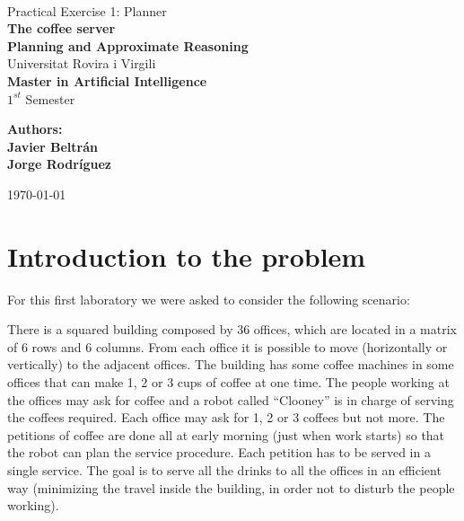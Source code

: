 \documentclass[12pt,a4paper,oneside]{article}
\date{\today}
\numberwithin{equation}{section}
\numberwithin{equation}{section}
\theoremstyle{definition}
\begin{document}
\begin{center}
	\textbf{ }\\[4cm]
	
	\LARGE Practical Exercise 1: Planner\\[0.5cm]
	\textbf{{\Huge The coffee server}}\\[0.5cm]
	\textbf{{\LARGE Planning and Approximate Reasoning}}\\[1.5cm]
	
	{\Large Universitat Rovira i Virgili}\\[2.3cm]
	{\LARGE \textbf{Master in Artificial Intelligence}}\\[0.5cm]
	{\LARGE $1^{st}$ Semester}\\[2.5cm]
	
	\begin{flushright}
		\textbf{\large{Authors:}\\ \normalsize{Javier Beltr\'an\\Jorge Rodr\'iguez\\}}
	\end{flushright}
	\today
\end{center}
\thispagestyle{empty} 
\pagebreak

\section{Introduction to the problem}

For this first laboratory we were asked to consider the following scenario:

There is a squared building composed by 36 offices, which are located in a matrix of 6 rows and 6 columns. From each office it is possible to move (horizontally or vertically) to the adjacent offices. The building has some coffee machines in some offices that can make 1, 2 or 3 cups of coffee at one time.
The people working at the offices may ask for coffee and a robot called “Clooney” is in charge of serving the coffees required. Each office may ask for 1, 2 or 3 coffees but not more. The petitions of coffee are done all at early morning (just when work starts) so that the robot can plan the service procedure. Each petition has to be served in a single service.
The goal is to serve all the drinks to all the offices in an efficient way (minimizing the travel inside the building, in order not to disturb the people working).
\end{document}
